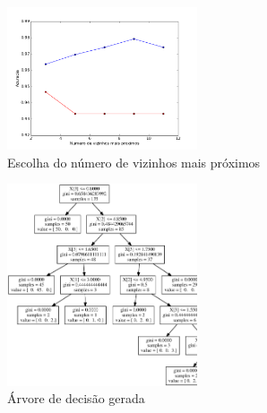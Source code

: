 \documentclass[12pt, a4paper, brazil]{article}
\begin{document}
\begin{figure}[!htb]
  \caption{Escolha do número de vizinhos mais próximos}
  \centering
    \includegraphics[width=0.5\textwidth]{iris/knn.png}
\end{figure}

\begin{figure}[!htb]
  \caption{Árvore de decisão gerada}
  \centering
    \includegraphics[width=0.5\textwidth]{iris/arvore.eps}
\end{figure}


\newpage

\end{document}
